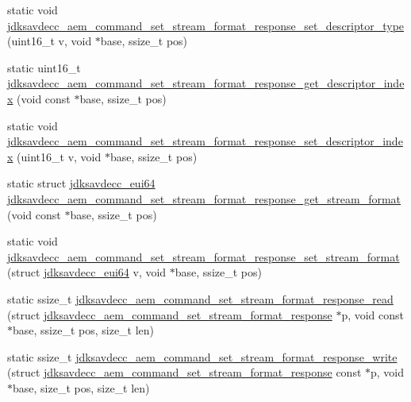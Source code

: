 \begin{DoxyCompactItemize}
static void \hyperlink{group__command__set__stream__format__response_ga88f065c8ecbabaa62fac78bc2729c1b7}{jdksavdecc\+\_\+aem\+\_\+command\+\_\+set\+\_\+stream\+\_\+format\+\_\+response\+\_\+set\+\_\+descriptor\+\_\+type} (uint16\+\_\+t v, void $\ast$base, ssize\+\_\+t pos)
\item 
static uint16\+\_\+t \hyperlink{group__command__set__stream__format__response_gad537666f50834335936b9c8147d02110}{jdksavdecc\+\_\+aem\+\_\+command\+\_\+set\+\_\+stream\+\_\+format\+\_\+response\+\_\+get\+\_\+descriptor\+\_\+index} (void const $\ast$base, ssize\+\_\+t pos)
\item 
static void \hyperlink{group__command__set__stream__format__response_ga301041226e66d6958e23942badbe9bf6}{jdksavdecc\+\_\+aem\+\_\+command\+\_\+set\+\_\+stream\+\_\+format\+\_\+response\+\_\+set\+\_\+descriptor\+\_\+index} (uint16\+\_\+t v, void $\ast$base, ssize\+\_\+t pos)
\item 
static struct \hyperlink{structjdksavdecc__eui64}{jdksavdecc\+\_\+eui64} \hyperlink{group__command__set__stream__format__response_ga5721fd066a9d109ca693996cf2718dcb}{jdksavdecc\+\_\+aem\+\_\+command\+\_\+set\+\_\+stream\+\_\+format\+\_\+response\+\_\+get\+\_\+stream\+\_\+format} (void const $\ast$base, ssize\+\_\+t pos)
\item 
static void \hyperlink{group__command__set__stream__format__response_gacb17d3119cee9e6d08f33eb81e79e54d}{jdksavdecc\+\_\+aem\+\_\+command\+\_\+set\+\_\+stream\+\_\+format\+\_\+response\+\_\+set\+\_\+stream\+\_\+format} (struct \hyperlink{structjdksavdecc__eui64}{jdksavdecc\+\_\+eui64} v, void $\ast$base, ssize\+\_\+t pos)
\item 
static ssize\+\_\+t \hyperlink{group__command__set__stream__format__response_ga6e89b94300d1d27dc34f6b57fa234690}{jdksavdecc\+\_\+aem\+\_\+command\+\_\+set\+\_\+stream\+\_\+format\+\_\+response\+\_\+read} (struct \hyperlink{structjdksavdecc__aem__command__set__stream__format__response}{jdksavdecc\+\_\+aem\+\_\+command\+\_\+set\+\_\+stream\+\_\+format\+\_\+response} $\ast$p, void const $\ast$base, ssize\+\_\+t pos, size\+\_\+t len)
\item 
static ssize\+\_\+t \hyperlink{group__command__set__stream__format__response_ga1c3d0dd6dac6bcb47c3262c1fc49479f}{jdksavdecc\+\_\+aem\+\_\+command\+\_\+set\+\_\+stream\+\_\+format\+\_\+response\+\_\+write} (struct \hyperlink{structjdksavdecc__aem__command__set__stream__format__response}{jdksavdecc\+\_\+aem\+\_\+command\+\_\+set\+\_\+stream\+\_\+format\+\_\+response} const $\ast$p, void $\ast$base, size\+\_\+t pos, size\+\_\+t len)
\end{DoxyCompactItemize}


